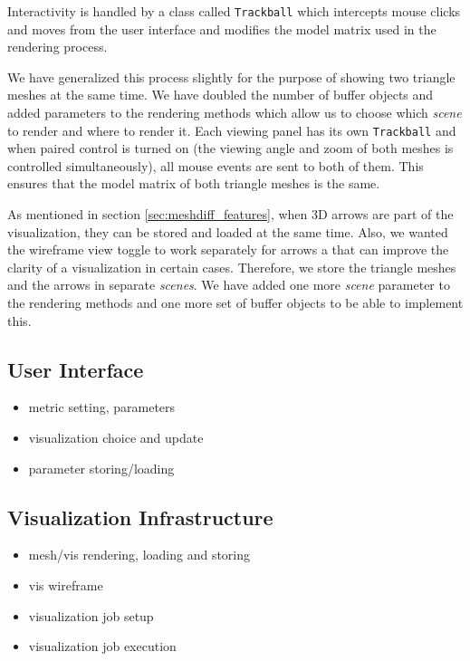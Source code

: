 Interactivity is handled by a class called \verb+Trackball+ which intercepts mouse clicks and moves from the user interface and modifies the model matrix used in the rendering process.

We have generalized this process slightly for the purpose of showing two triangle meshes at the same time. We have doubled the number of buffer objects and added parameters to the rendering methods which allow us to choose which {\it scene} to render and where to render it. Each viewing panel has its own \verb+Trackball+ and when paired control is turned on (the viewing angle and zoom of both meshes is controlled simultaneously), all mouse events are sent to both of them. This ensures that the model matrix of both triangle meshes is the same.

As mentioned in section \ref{sec:meshdiff_features}, when 3D arrows are part of the visualization, they can be stored and loaded at the same time. Also, we wanted the wireframe view toggle to work separately for arrows a that can improve the clarity of a visualization in certain cases. Therefore, we store the triangle meshes and the arrows in separate {\it scenes}. We have added one more {\it scene} parameter to the rendering methods and one more set of buffer objects to be able to implement this.
\subsection{User Interface}

\begin{itemize}
\item metric setting, parameters
\item visualization choice and update
\item parameter storing/loading
\end{itemize}
\subsection{Visualization Infrastructure}

\begin{itemize}
\item mesh/vis rendering, loading and storing
\item vis wireframe
\item visualization job setup
\item visualization job execution
\end{itemize}